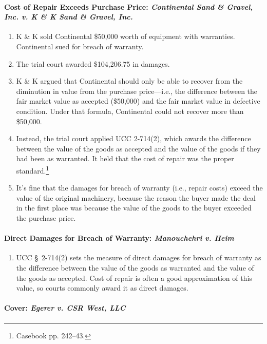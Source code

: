 \paragraph{Cost of Repair Exceeds Purchase Price: \emph{Continental Sand \& 
Gravel, Inc. v. K \& K Sand \& Gravel, Inc.}}
\begin{enumerate}
    \item K \& K sold Continental \$50,000 worth of equipment with warranties. 
    Continental sued for breach of warranty.
    \item The trial court awarded \$104,206.75 in damages.
    \item K \& K argued that Continental should only be able to recover from 
    the diminution in value from the purchase price---i.e., the difference 
    between the fair market value as accepted (\$50,000) and the fair market 
    value in defective condition. Under that formula, Continental could not 
    recover more than \$50,000.
    \item Instead, the trial court applied UCC 2-714(2), which awards the 
    difference between the value of the goods as accepted and the value of the 
    goods if they had been as warranted. It held that the cost of repair was 
    the proper standard.\footnote{Casebook pp. 242--43.}
    \item It's fine that the damages for breach of warranty (i.e., repair 
    costs) exceed the value of the original machinery, because the reason the 
    buyer made the deal in the first place was because the value of the goods 
    to the buyer exceeded the purchase price.
\end{enumerate}

\paragraph{Direct Damages for Breach of Warranty: \emph{Manouchehri v. Heim}}

\begin{enumerate}
    \item UCC \S\ 2-714(2) sets the measure of direct damages for breach of 
    warranty as the difference between the value of the goods as warranted and 
    the value of the goods as accepted. Cost of repair is often a good 
    approximation of this value, so courts commonly award it as direct 
    damages.
\end{enumerate}

\paragraph{Cover: \emph{Egerer v. CSR West, LLC}}

